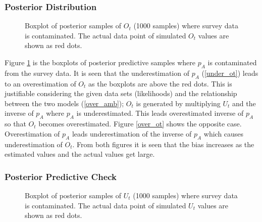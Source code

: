 \documentclass[
10pt, %
letterpaper, %
oneside, %
headinclude,footinclude, %
BCOR5mm, %
]{article}
\begin{document}
\subsubsection{Posterior Distribution}

\begin{figure}[htb]
	\centering
	\caption[two early result box plots:]{Boxplot of posterior samples of $O_t$ (1000 samples) where survey data is contaminated.  The actual data point of simulated $O_t$ values are shown as red dots.}
	\label{contam_ot}
\end{figure}

\normalsize 
Figure \ref{contam_ot} is the boxplots of posterior predictive samples where $p_A$ is contaminated from the survey data. It is seen that the underestimation of $p_A$ (\ref{under_ot}) leads to an overestimation of $O_t$ as the boxplots are above the red dots. This is justifiable considering the given data sets (likelihoods) and the relationship between the two models (\ref{over_amb}); $O_t$ is generated by multiplying $U_t$ and the inverse of $p_A$ where $p_A$ is underestimated. This leads overestimated inverse of $p_A$ so that  $O_t$ becomes overestimated. Figure \ref{over_ot} shows the opposite case. Overestimation of $p_A$ leads underestimation of the inverse of $p_A$ which causes underestimation of $O_t$. From both figures it is seen that the bias increases as the estimated values and the actual values get large.\\


\subsubsection{Posterior Predictive Check}

\begin{figure}[htb]
	\centering
	\caption[two early result box plots:ut]{Boxplot of posterior samples of $U_t$ (1000 samples) where survey data is contaminated.  The actual data point of simulated $U_t$ values are shown as red dots.}
	\label{contam_ut}
\end{figure}
\end{document}
